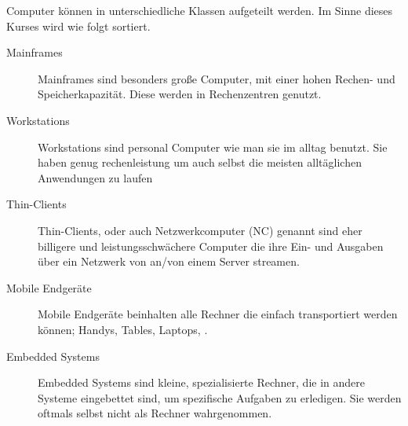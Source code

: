 \documentclass{article}
\begin{document}
Computer können in unterschiedliche Klassen aufgeteilt werden. Im Sinne dieses Kurses wird wie folgt sortiert.
\begin{description}
 \item[Mainframes] Mainframes sind besonders große Computer, mit einer hohen Rechen- und Speicherkapazität. Diese werden in Rechenzentren genutzt.
 \item[Workstations] Workstations sind personal Computer wie man sie im alltag benutzt. Sie haben genug rechenleistung um auch selbst die meisten alltäglichen Anwendungen zu laufen
 \item[Thin-Clients] Thin-Clients, oder auch Netzwerkcomputer (NC) genannt sind eher billigere und leistungsschwächere Computer die ihre Ein- und Ausgaben über ein Netzwerk von an/von einem Server streamen.
 \item[Mobile Endgeräte] Mobile Endgeräte beinhalten alle Rechner die einfach transportiert werden können; Handys, Tables, Laptops, \etc.
 \item[Embedded Systems] Embedded Systems sind kleine, spezialisierte Rechner, die in andere Systeme eingebettet sind, um spezifische Aufgaben zu erledigen. Sie werden oftmals selbst nicht als Rechner wahrgenommen.
\end{description}
\end{document}
